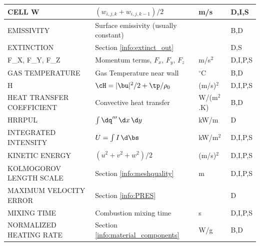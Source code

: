 \documentclass[11pt]{book}
\begin{document}
\begin{longtable}{@{\extracolsep{\fill}}|l|l|l|l|}
{\ct CELL W}                                    & $(w_{i,j,k}+w_{i,j,k-1})/2$                       & m/s            & D,I,S        \\ \hline
{\ct EMISSIVITY}                                & Surface emissivity (usually constant)             &                & B,D          \\ \hline
{\ct EXTINCTION}                                & Section \ref{info:extinct_out}                    &                & D,S          \\ \hline
{\ct F\_X, F\_Y, F\_Z}                          & Momentum terms, $F_x$, $F_y$, $F_z$               & m/s$^2$        & D,I,P,S      \\ \hline
{\ct GAS TEMPERATURE}                           & Gas Temperature near wall                         & $^\circ$C      & B,D          \\ \hline
{\ct H}                                         & $\cH=|\bu|^2/2 + \tp/\rho_0$                    & (m/s)$^2$      & D,I,P,S      \\ \hline
{\ct HEAT TRANSFER COEFFICIENT}                 & Convective heat transfer                          & \si{W/(m$^2$.K)} & B,D          \\ \hline
{\ct HRRPUL}                                    & $\int \dq''' \, \d x \, \d y$                     & kW/m           & D            \\ \hline
{\ct INTEGRATED INTENSITY}                      & $U=\int I \, \d \bs$                              & kW/m$^2$       & D,I,P,S      \\ \hline
{\ct KINETIC ENERGY}                            & $(u^2+v^2+w^2)/2$                                 & (m/s)$^2$      & D,I,P,S      \\ \hline
{\ct KOLMOGOROV LENGTH SCALE}                   & Section \ref{info:meshquality}                    & m              & D,I,P,S      \\ \hline
{\ct MAXIMUM VELOCITY ERROR}                    & Section \ref{info:PRES}                           &                & D            \\ \hline
{\ct MIXING TIME}                               & Combustion mixing time                            & s              & D,I,P,S      \\ \hline
{\ct NORMALIZED HEATING RATE}                   & Section \ref{info:material_components}            & W/g            & B,D          \\ \hline

\end{longtable}
\end{document}
